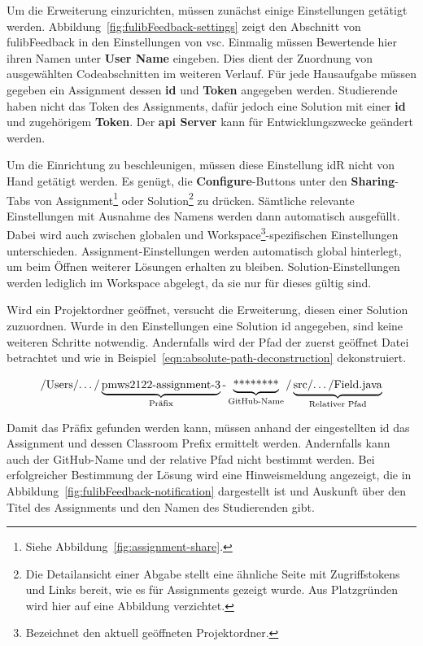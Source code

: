 Um die Erweiterung einzurichten, müssen zunächst einige Einstellungen getätigt werden.
Abbildung~\ref{fig:fulibFeedback-settings} zeigt den Abschnitt von fulibFeedback in den Einstellungen von \ac{vsc}.
Einmalig müssen Bewertende hier ihren Namen unter \textbf{User Name} eingeben.
Dies dient der Zuordnung von ausgewählten Codeabschnitten im weiteren Verlauf.
Für jede Hausaufgabe müssen gegeben ein Assignment dessen \textbf{\acs{id}} und \textbf{Token} angegeben werden.
Studierende haben nicht das Token des Assignments, dafür jedoch eine Solution mit einer \textbf{\acs{id}} und zugehörigem \textbf{Token}.
Der \textbf{\acs{api} Server} kann für Entwicklungszwecke geändert werden.

Um die Einrichtung zu beschleunigen, müssen diese Einstellung \ac{idR} nicht von Hand getätigt werden.
Es genügt, die \textbf{Configure}-Buttons unter den \textbf{Sharing}-Tabs von Assignment\footnote{
    Siehe Abbildung~\ref{fig:assignment-share}.
} oder Solution\footnote{
    Die Detailansicht einer Abgabe stellt eine ähnliche Seite mit Zugriffstokens und Links bereit, wie es für Assignments gezeigt wurde.
    Aus Platzgründen wird hier auf eine Abbildung verzichtet.
} zu drücken.
Sämtliche relevante Einstellungen mit Ausnahme des Namens werden dann automatisch ausgefüllt.
Dabei wird auch zwischen globalen und Workspace\footnote{
    Bezeichnet den aktuell geöffneten Projektordner.
}-spezifischen Einstellungen unterschieden.
Assignment-Einstellungen werden automatisch global hinterlegt, um beim Öffnen weiterer Lösungen erhalten zu bleiben.
Solution-Einstellungen werden lediglich im Workspace abgelegt, da sie nur für dieses gültig sind.

Wird ein Projektordner geöffnet, versucht die Erweiterung, diesen einer Solution zuzuordnen.
Wurde in den Einstellungen eine Solution \acs{id} angegeben, sind keine weiteren Schritte notwendig.
Andernfalls wird der Pfad der zuerst geöffnet Datei betrachtet und wie in Beispiel~\ref{eqn:absolute-path-deconstruction} dekonstruiert.

\begin{equation}\label{eqn:absolute-path-deconstruction}
    \text{/Users/\dots/}
    \underbrace{\text{pmws2122-assignment-3}}_{\text{Präfix}}
    \text{-}
    \underbrace{\text{********}}_{\text{GitHub-Name}}
    \text{/}
    \underbrace{\text{src/\dots/Field.java}}_{\text{Relativer Pfad}}
\end{equation}

Damit das Präfix gefunden werden kann, müssen anhand der eingestellten \acs{id} das Assignment und dessen Classroom Prefix ermittelt werden.
Andernfalls kann auch der GitHub-Name und der relative Pfad nicht bestimmt werden.
Bei erfolgreicher Bestimmung der Lösung wird eine Hinweismeldung angezeigt, die in Abbildung~\ref{fig:fulibFeedback-notification} dargestellt ist und Auskunft über den Titel des Assignments und den Namen des Studierenden gibt.

